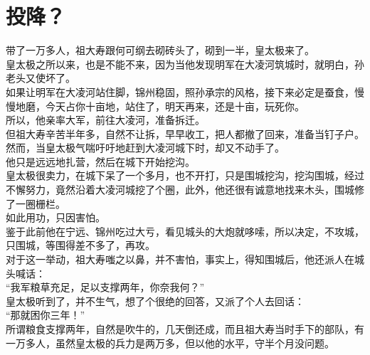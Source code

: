 \section{投降？}
\ifnum{}
	\begin{multicols}{\theparacolNo}
\fi
带了一万多人，祖大寿跟何可纲去砌砖头了，砌到一半，皇太极来了。\\

皇太极之所以来，也是不能不来，因为当他发现明军在大凌河筑城时，就明白，孙老头又使坏了。\\

如果让明军在大凌河站住脚，锦州稳固，照孙承宗的风格，接下来必定是蚕食，慢慢地磨，今天占你十亩地，站住了，明天再来，还是十亩，玩死你。\\

所以，他亲率大军，前往大凌河，准备拆迁。\\

但祖大寿辛苦半年多，自然不让拆，早早收工，把人都撤了回来，准备当钉子户。\\

然而，当皇太极气喘吁吁地赶到大凌河城下时，却又不动手了。\\

他只是远远地扎营，然后在城下开始挖沟。\\

皇太极很卖力，在城下呆了一个多月，也不开打，只是围城挖沟，挖沟围城，经过不懈努力，竟然沿着大凌河城挖了个圈，此外，他还很有诚意地找来木头，围城修了一圈栅栏。\\

如此用功，只因害怕。\\

鉴于此前他在宁远、锦州吃过大亏，看见城头的大炮就哆嗦，所以决定，不攻城，只围城，等围得差不多了，再攻。\\

对于这一举动，祖大寿嗤之以鼻，并不害怕，事实上，得知围城后，他还派人在城头喊话：\\

“我军粮草充足，足以支撑两年，你奈我何？”\\

皇太极听到了，并不生气，想了个很绝的回答，又派了个人去回话：\\

“那就困你三年！”\\

所谓粮食支撑两年，自然是吹牛的，几天倒还成，而且祖大寿当时手下的部队，有一万多人，虽然皇太极的兵力是两万多，但以他的水平，守半个月没问题。\\


\end{multicols}
